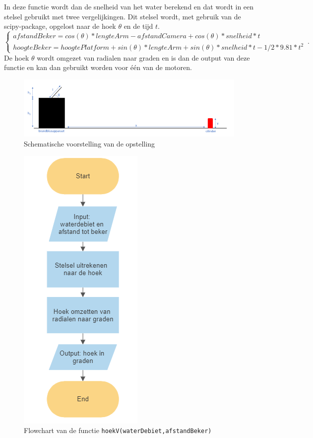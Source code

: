 \documentclass[kulak]{kulakarticle} %
\begin{document}
			In deze functie wordt dan de snelheid van het water berekend en dat wordt in een stelsel gebruikt met twee vergelijkingen. Dit stelsel wordt, met gebruik van de scipy-package, opgelost naar de hoek \(\theta\) en de tijd \(t\).
				\begin{equation}
					\begin{cases}
						afstandBeker  = cos(\theta )*lengteArm - afstandCamera + cos(\theta )*snelheid*t \\ 
						hoogteBeker  =  hoogtePlatform + sin(\theta )*lengteArm + sin(\theta )*snelheid*t - 1/2*9.81*t^2
					\end{cases}\,.
				\end{equation}
			De hoek \(\theta\) wordt omgezet van radialen naar graden en is dan de output van deze functie en kan dan gebruikt worden voor één van de motoren.

				\begin{figure} [h!]
					\centering
					\includegraphics[width = 1 \textwidth]{schematische voorstelling water LATEX}
					\caption{Schematische voorstelling van de opstelling}
					\label{schematische voorstelling}
				\end{figure}

				\begin{figure} [h!]
					\centering
					\includegraphics[width = .2 \textwidth]{flowchart_hoekV}
				\cprotect\caption{Flowchart van de functie \verb*|hoekV(waterDebiet,afstandBeker)|}
					\label{flowchart_water}
				\end{figure}
\end{document}
